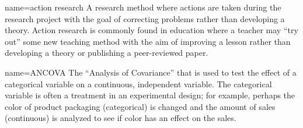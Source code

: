 







{name={action research}}
{%
	A research method where actions are taken during the research project with the goal of correcting problems rather than developing a theory. Action research is commonly found in education where a teacher may ``try out'' some new teaching method with the aim of improving a lesson rather than developing a theory or publishing a peer-reviewed paper.
}

{name={ANCOVA}}
{%
	The ``Analysis of Covariance'' that is used to test the effect of a categorical variable on a continuous, independent variable. The categorical variable is often a treatment in an experimental design; for example, perhaps the color of product packaging (categorical) is changed and the amount of sales (continuous) is analyzed to see if color has an effect on the sales.
}

